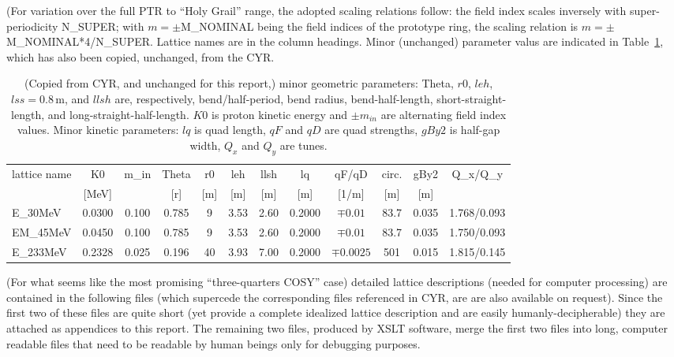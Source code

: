 \documentclass[]{article}
\begin{document}
%
(For variation over the full PTR to ``Holy Grail'' range, 
the adopted scaling relations follow: the field index scales inversely with 
super-periodicity N\_SU\-PER; with $m=\pm$M\_NOMINAL being the field indices of the 
prototype ring, the scaling relation is $m=\pm$M\_NOMINAL*4/N\_SUPER. 
Lattice names are in the column headings. 
Minor (unchanged) parameter valus are indicated in Table~\ref{tbl:MagicScaling.2}, which has
also been copied, unchanged, from the CYR.
%
\begin{table}[h] \scriptsize
\caption{\label{tbl:MagicScaling.2}(Copied from CYR, and unchanged for this report,) 
minor geometric parameters: Theta, $r0$, 
$leh$, $lss=0.8$\,m, and $llsh$ are, respectively, bend/half-period, bend radius, 
bend-half-length, short-straight-length, and long-straight-half-length. 
$K0$ is proton kinetic energy and $\pm m_{in}$ are alternating field index values.
Minor kinetic parameters: $lq$ is quad length, $qF$ and
$qD$ are quad strengths, $gBy2$ is half-gap width, $Q_x$ and $Q_y$ are tunes.
}
\centering
\begin{tabular}{|l|cccccc|ccccc|}  \hline
lattice name &    K0    &  m\_in  &  Theta &  r0  & leh  & llsh &   lq    &   qF/qD     &  circ. &  gBy2   &   Q\_x/Q\_y \\
             &  [MeV]   &         &    [r] & [m]  & [m]  &  [m] &   [m]   &   [1/m]     &   [m]  &   [m]   &              \\ \hline
E\_30MeV     &  0.0300  &  0.100  &  0.785 &  9   & 3.53 & 2.60 &  0.2000 & $\mp0.01$   & 83.7   &  0.035  &  1.768/0.093 \\  \hline
EM\_45MeV    &  0.0450  &  0.100  &  0.785 &  9   & 3.53 & 2.60 &  0.2000 & $\mp0.01$   &  83.7  &  0.035  &  1.750/0.093 \\ \hline
E\_233MeV    &  0.2328  &  0.025  &  0.196 & 40   & 3.93 & 7.00 &  0.2000 & $\mp0.0025$ &  501   &  0.015  &  1.815/0.145 \\  \hline
\end{tabular}
\end{table}
%

(For what seems like the most promising ``three-quarters COSY'' case)
detailed lattice descriptions (needed for computer processing) 
are contained in the following files (which supercede the
corresponding files referenced in CYR, are are also available on request).
Since the first two of these files are quite short (yet provide a complete idealized lattice 
description and are easily humanly-decipherable) they are attached as appendices to this report.
The remaining two files, produced by XSLT software, merge the first two files into long,
computer readable files that need to be readable by human beings only for debugging purposes.
\end{document}
